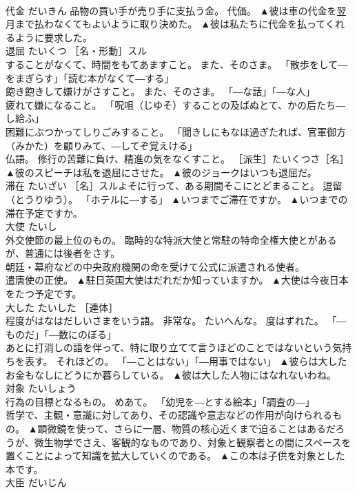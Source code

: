 \documentclass[8pt]{extreport}
\begin{document}
\begin{CJK}{UTF8}{min}
\\	代金	だいきん	品物の買い手が売り手に支払う金。 代価。	▲彼は車の代金を翌月まで払わなくてもよいように取り決めた。 ▲彼は私たちに代金を払ってくれるように要求した。
\\	退屈	たいくつ	［名・形動］スル 
\\	することがなくて、時間をもてあますこと。 また、そのさま。 「散歩をして―をまぎらす」「読む本がなくて―する」 
\\	飽き飽きして嫌けがさすこと。 また、そのさま。 「―な話」「―な人」 
\\	疲れて嫌になること。 「呪咀（じゆそ）することの及ばぬとて、かの后たち―し給ふ」 
\\	困難にぶつかってしりごみすること。 「聞きしにもなほ過ぎたれば、官軍御方（みかた）を顧りみて、―してぞ覚えける」 
\\	仏語。 修行の苦難に負け、精進の気をなくすこと。 ［派生］たいくつさ［名］	▲彼のスピーチは私を退屈にさせた。 ▲彼のジョークはいつも退屈だ。
\\	滞在	たいざい	［名］スルよそに行って、ある期間そこにとどまること。 逗留（とうりゆう）。 「ホテルに―する」	▲いつまでご滞在ですか。 ▲いつまでの滞在予定ですか。
\\	大使	たいし	
\\	外交使節の最上位のもの。 臨時的な特派大使と常駐の特命全権大使とがあるが、普通には後者をさす。 
\\	朝廷・幕府などの中央政府機関の命を受けて公式に派遣される使者。 
\\	遣唐使の正使。	▲駐日英国大使はだれだか知っていますか。 ▲大使は今夜日本をたつ予定です。
\\	大した	たいした	［連体］ 
\\	程度がはなはだしいさまをいう語。 非常な。 たいへんな。 度はずれた。 「―ものだ」「―数にのぼる」 
\\	あとに打消しの語を伴って、特に取り立てて言うほどのことではないという気持ちを表す。 それほどの。 「―ことはない」「―用事ではない」	▲彼らは大したお金もなしにどうにか暮らしている。 ▲彼は大した人物にはなれないわね。
\\	対象	たいしょう	
\\	行為の目標となるもの。 めあて。 「幼児を―とする絵本」「調査の―」 
\\	哲学で、主観・意識に対してあり、その認識や意志などの作用が向けられるもの。	▲顕微鏡を使って、さらに一層、物質の核心近くまで迫ることはあるだろうが、微生物学でさえ、客観的なものであり、対象と観察者との間にスペースを置くことによって知識を拡大していくのである。 ▲この本は子供を対象とした本です。
\\	大臣	だいじん	

\end{CJK}
\end{document}

